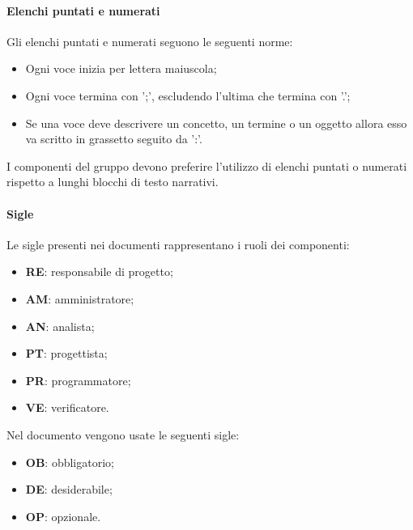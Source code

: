 \paragraph{Elenchi puntati e numerati}
Gli elenchi puntati e numerati seguono le seguenti norme:
\begin{itemize}

	\item Ogni voce inizia per lettera maiuscola;
	
	\item Ogni voce termina con ';', escludendo l'ultima che termina con '.';
	
	\item Se una voce deve descrivere un concetto, un termine o un oggetto allora esso va scritto in grassetto seguito da ':'.
\end{itemize}

I componenti del gruppo devono preferire l'utilizzo di elenchi puntati o numerati rispetto a lunghi blocchi di testo narrativi. 

\paragraph{Sigle}
Le sigle presenti nei documenti rappresentano i ruoli dei componenti:
\begin{itemize}

	\item \textbf{RE}: responsabile di progetto;
	
	\item \textbf{AM}: amministratore;
	
	\item \textbf{AN}: analista;
	
	\item \textbf{PT}: progettista;
	
	\item \textbf{PR}: programmatore;
	
	\item \textbf{VE}: verificatore.

\end{itemize}

Nel documento  vengono usate le seguenti sigle:
\begin{itemize}
	\item \textbf{OB}: obbligatorio;
	\item \textbf{DE}: desiderabile;
	\item \textbf{OP}: opzionale.
\end{itemize}

